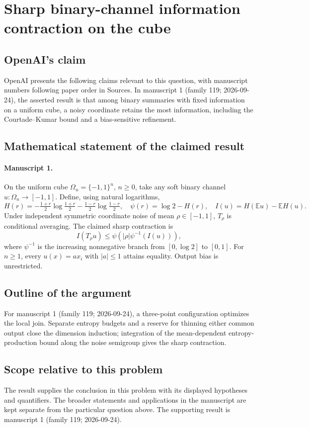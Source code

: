 \documentclass[11pt]{article}
\begin{document}
\section*{Sharp binary-channel information contraction on the cube}

\subsection{OpenAI's claim}
OpenAI presents the following claims relevant to this question, with manuscript numbers following paper order in Sources. In manuscript 1 (family 119; 2026-09-24), the asserted result is that among binary summaries with fixed information on a uniform cube, a noisy coordinate retains the most information, including the Courtade--Kumar bound and a bias-sensitive refinement.

\subsection{Mathematical statement of the claimed result}
\paragraph{Manuscript 1.}
On the uniform cube $\Omega_n=\{-1,1\}^n$, $n\ge0$, take any soft binary channel $u:\Omega_n\to[-1,1]$. Define, using natural logarithms,
\[
 H(r)=-\tfrac{1+r}2\log\tfrac{1+r}2-\tfrac{1-r}2\log\tfrac{1-r}2,
 \quad\psi(r)=\log2-H(r),\quad I(u)=H(\mathbb Eu)-\mathbb EH(u).
\]
Under independent symmetric coordinate noise of mean $\rho\in[-1,1]$, $T_{\rho}$ is conditional averaging. The claimed sharp contraction is
\[
 I(T_{\rho} u)\le\psi(|\rho|\psi^{-1}(I(u))),
\]
where $\psi^{-1}$ is the increasing nonnegative branch from $[0,\log2]$ to $[0,1]$. For $n\ge1$, every $u(x)=ax_i$ with $|a|\le1$ attains equality. Output bias is unrestricted.

\subsection{Outline of the argument}
For manuscript 1 (family 119; 2026-09-24), a three-point configuration optimizes the local join. Separate entropy budgets and a reserve for thinning either common output close the dimension induction; integration of the mean-dependent entropy-production bound along the noise semigroup gives the sharp contraction.

\subsection{Scope relative to this problem}
The result supplies the conclusion in this problem with its displayed hypotheses and quantifiers. The broader statements and applications in the manuscript are kept separate from the particular question above. The supporting result is manuscript 1 (family 119; 2026-09-24).
\end{document}

